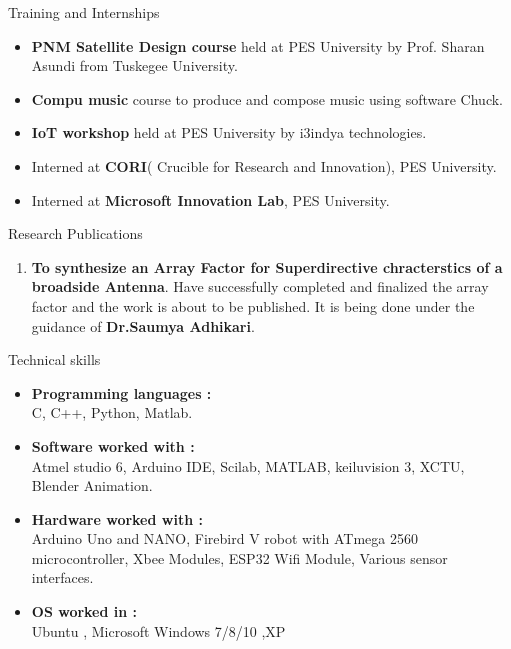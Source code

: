 \documentclass{resume} %
\begin{document}
\vskip 0.5in

\begin{rSection}{Training and Internships}
\begin{itemize}
    \item {\bf PNM Satellite Design course} held at PES University by Prof. Sharan Asundi from Tuskegee University.
    \item {\bf Compu music} course to produce and compose music using software Chuck.
    \item {\bf IoT workshop} held at PES University by i3indya technologies.
    \item Interned at {\bf CORI}( Crucible for Research and Innovation), PES University.
    \item Interned at {\bf Microsoft Innovation Lab}, PES University.\\

\end{itemize}
\end{rSection}

\vskip 0.5in

\begin{rSection}{Research Publications}
\begin{enumerate}
    \item {\bf To synthesize an Array Factor for Superdirective chracterstics of a broadside Antenna}. Have successfully completed and finalized the array factor and the work is about to be published. It is being done under the guidance of {\bf Dr.Saumya Adhikari}.\\
\end{enumerate}
\end{rSection}

\pagebreak

\begin{rSection}{Technical skills}
\begin{itemize}
    \item {\bf Programming languages :} \\
     C, C++, Python, Matlab.
     \item {\bf Software worked with :} \\
     Atmel studio 6, Arduino IDE, Scilab, MATLAB, keiluvision 3, XCTU, Blender Animation.
     \item {\bf Hardware worked with :} \\
     Arduino Uno and NANO, Firebird V robot with ATmega 2560 microcontroller, Xbee Modules, ESP32 Wifi Module, Various sensor interfaces.
     
     \item {\bf OS worked in :} \\
     Ubuntu , Microsoft Windows 7/8/10 ,XP
\end{itemize}
\end{rSection}
\end{document}

